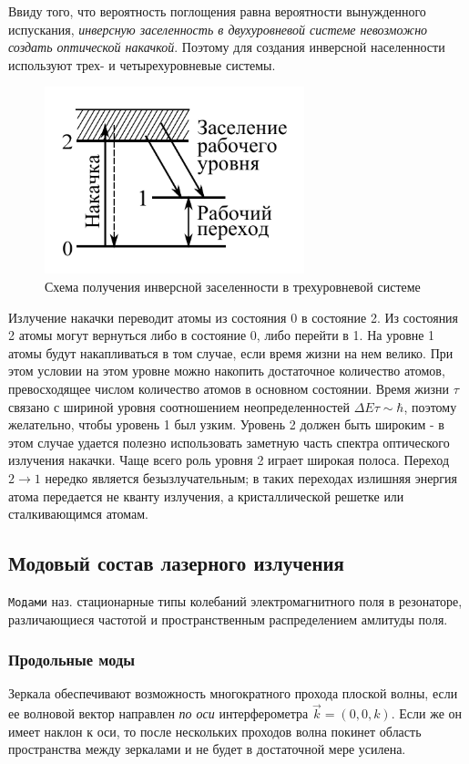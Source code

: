 \documentclass[a4paper,12pt]{article}
\begin{document}
Ввиду того, что вероятность поглощения равна вероятности вынужденного испускания, \textit{инверсную заселенность в двухуровневой системе невозможно создать оптической накачкой}. Поэтому для создания инверсной населенности используют трех- и четырехуровневые системы.

\begin{figure}[h]
\centering
\includegraphics[width=0.2\linewidth]{img8.png}
\caption{Схема получения инверсной заселенности в трехуровневой системе}
\label{img8}
\end{figure}

Излучение накачки переводит атомы из состояния 0 в состояние 2. Из состояния 2 атомы могут вернуться либо в состояние 0, либо перейти в 1. На уровне 1 атомы будут накапливаться в том случае, если время жизни на нем велико. При этом условии на этом уровне можно накопить достаточное количество атомов, превосходящее числом количество атомов в основном состоянии. Время жизни $\tau$ связано с шириной уровня соотношением неопределенностей $\Delta E\tau\sim\hbar$, поэтому желательно, чтобы уровень 1 был узким. Уровень 2 должен быть широким - в этом случае удается полезно использовать заметную часть спектра оптического излучения накачки. Чаще всего роль уровня 2 играет широкая полоса. Переход $2\rightarrow 1$ нередко является безызлучательным; в таких переходах излишняя энергия атома передается не кванту излучения, а кристаллической решетке или сталкивающимся атомам.

\subsection{Модовый состав лазерного излучения}

\texttt{Модами} наз. стационарные типы колебаний электромагнитного поля в резонаторе, различающиеся частотой и пространственным распределением амлитуды поля.

\subsubsection{Продольные моды}

Зеркала обеспечивают возможность многократного прохода плоской волны, если ее волновой вектор направлен \textit{по оси} интерферометра $\vec{k}=(0,0,k)$. Если же он имеет наклон к оси, то после нескольких проходов волна покинет область пространства между зеркалами и не будет в достаточной мере усилена.
\end{document}
